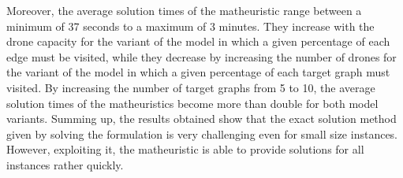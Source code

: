 Moreover, the average solution times of the matheuristic range between a minimum of 37 seconds to a maximum of 3 minutes. They increase with the drone capacity for the variant of the model in which a given percentage of each edge must be visited, while they decrease by increasing the number of drones for the variant of the model in which a given percentage of each target graph must visited. By increasing the number of target graphs from 5 to 10, the average solution times of the matheuristics become more than double for both model variants.
Summing up, the results obtained show that the exact solution method given by solving the formulation is very challenging even for small size instances. However, exploiting it, the matheuristic is able to provide  solutions for all instances rather quickly.


